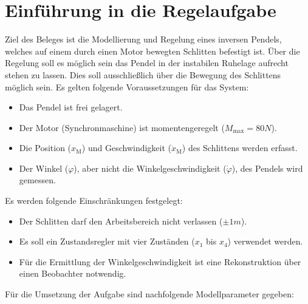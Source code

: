 \section{Einführung in die Regelaufgabe} \label{einfuehrung}

Ziel des Beleges ist die Modellierung und Regelung eines inversen Pendels, welches auf einem durch einen Motor bewegten Schlitten befestigt ist. Über die Regelung soll es möglich sein das Pendel in der instabilen Ruhelage aufrecht stehen zu lassen. Dies soll ausschließlich über die Bewegung des Schlittens möglich sein. Es gelten folgende Voraussetzungen für das System:

\begin{itemize}
    \item Das Pendel ist frei gelagert.
    \item Der Motor (Synchronmaschine) ist momentengeregelt ($M_{\mathrm{max}} = 80N$).
    \item Die Position ($x_{\mathrm{M}}$) und Geschwindigkeit ($\dot{x}_{\mathrm{M}}$) des Schlittens werden erfasst.
    \item Der Winkel ($\varphi$), aber nicht die Winkelgeschwindigkeit ($\dot{\varphi}$), des Pendels wird gemessen.
\end{itemize}

Es werden folgende Einschränkungen festgelegt:

\begin{itemize}
    \item Der Schlitten darf den Arbeitsbereich nicht verlassen ($\pm 1m$).
    \item Es soll ein Zustandsregler mit vier Zuständen ($x_{\mathrm{1}}$ bis $x_{\mathrm{4}}$) verwendet werden.
    \item Für die Ermittlung der Winkelgeschwindigkeit ist eine Rekonstruktion über einen Beobachter notwendig.
\end{itemize}

Für die Umsetzung der Aufgabe sind nachfolgende Modellparameter gegeben:

